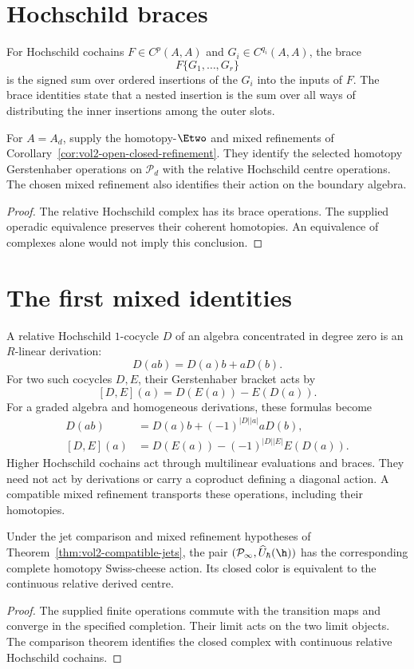 \section{Hochschild braces}
For Hochschild cochains $F\in C^p(A,A)$ and $G_i\in C^{q_i}(A,A)$, the brace
\[
 F\{G_1,\ldots,G_r\}
\]
is the signed sum over ordered insertions of the $G_i$ into the inputs of $F$.  The brace identities state that a nested insertion is the sum over all ways of distributing the inner insertions among the outer slots.

\begin{theorem}
For $A=A_d$, supply the homotopy-$\Etwo$ and mixed refinements of
Corollary~\ref{cor:vol2-open-closed-refinement}.
They identify the selected homotopy Gerstenhaber operations on
$\mathcal P_d$ with the relative Hochschild centre operations.
The chosen mixed refinement also identifies their action on the boundary algebra.
\end{theorem}
\begin{proof}
The relative Hochschild complex has its brace operations.
The supplied operadic equivalence preserves their coherent homotopies.
An equivalence of complexes alone would not imply this conclusion.
\end{proof}

\section{The first mixed identities}
A relative Hochschild $1$-cocycle $D$ of an algebra concentrated in degree zero
is an $R$-linear derivation:
\[
 D(ab)=D(a)b+aD(b).
\]
For two such cocycles $D,E$, their Gerstenhaber bracket acts by
\[
 [D,E](a)=D(E(a))-E(D(a)).
\]
For a graded algebra and homogeneous derivations, these formulas become
\[
\begin{split}
 D(ab)&=D(a)b+(-1)^{|D||a|}aD(b),\\
 [D,E](a)&=D(E(a))-(-1)^{|D||E|}E(D(a)).
\end{split}
\]
Higher Hochschild cochains act through multilinear evaluations and braces.
They need not act by derivations or carry a coproduct defining a diagonal action.
A compatible mixed refinement transports these operations, including their homotopies.

\begin{corollary}
Under the jet comparison and mixed refinement hypotheses of
Theorem~\ref{thm:vol2-compatible-jets}, the pair
$(\mathcal P_\infty,\widehat U_\hbar(\h))$
has the corresponding complete homotopy Swiss-cheese action.
Its closed color is equivalent to the continuous relative derived centre.
\end{corollary}
\begin{proof}
The supplied finite operations commute with the transition maps
and converge in the specified completion.
Their limit acts on the two limit objects.
The comparison theorem identifies the closed complex with continuous relative Hochschild cochains.
\end{proof}

